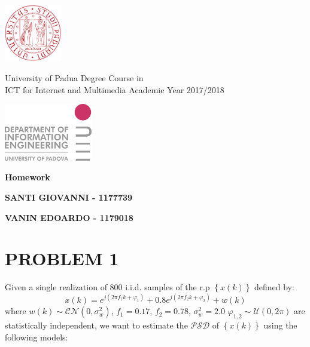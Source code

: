 \documentclass[a4paper,11pt,openright,twoside]{report}
\begin{document}
\begin{minipage}[b]{0.20\textwidth}    %
	\centering
	\includegraphics[height=2.5cm]{images/unipd}
\end{minipage}%
\begin{minipage}[b][2cm]{0.6\textwidth}
	\centering\large \sc
	University of Padua \vfill
	Degree Course in \\ ICT for Internet and Multimedia\vfill
	\small Academic Year 2017/2018 \end{minipage}%
\begin{minipage}[b]{0.20\textwidth}
	\centering 
	\includegraphics[height=2.5cm]{images/dei}
\end{minipage}

\vspace*{20pt}
\begin{center}\leavevmode
	\normalfont
	{\huge\raggedleft \bfseries\textsf{  Homework}\par}%
	\hrulefill\par
	{\LARGE\raggedright \textsf{\bfseries SANTI GIOVANNI - 1177739}\par}%
	\vspace*{20pt}
	{\LARGE\raggedright \textsf{\bfseries VANIN EDOARDO - 1179018}\par}%
	\vspace*{20pt}
\end{center}	
	
\section*{PROBLEM 1}
Given a single realization of 800 i.i.d. samples of the r.p $ \left\lbrace x(k) \right\rbrace$ defined by:
\begin{equation*}
x(k) = e^{j(2 \pi f_1k+\varphi_1)}+0.8e^{j(2 \pi f_2k+\varphi_2)}+w(k)
\end{equation*}
where $w(k)\sim \mathcal{CN}(0,\sigma_w^2)$, $f_1=0.17$, $f_2 = 0.78$, $\sigma_w^2=2.0$ $\varphi_{1,2}\sim \mathcal{U}(0,2\pi)$ are statistically independent, we want to estimate the $\mathcal{PSD}$ of $ \left\lbrace x(k) \right\rbrace$ using the following models:
\end{document}
